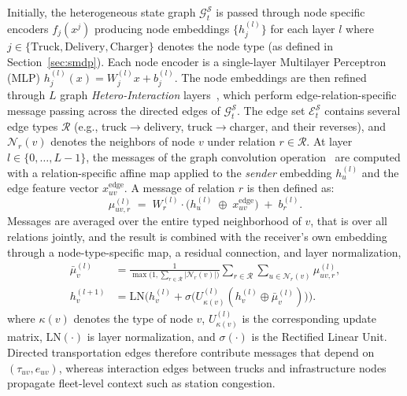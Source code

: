 \documentclass[journal]{IEEEtran}
\begin{document}
Initially, the heterogeneous state graph $\mathcal{G}^{\mathcal{S}}_t$ is passed through node specific encoders $f_j(x^j)$ producing node embeddings $\{h_j^{(l)}\}$ for each layer $l$ where $j\in\{\mathrm{Truck},\mathrm{Delivery},\mathrm{Charger}\}$ denotes the node type (as defined in Section~\ref{sec:smdp}).
Each node encoder is a single-layer Multilayer Perceptron (MLP) $h_j^{(l)}(x)=W^{(l)}_{j}x+b^{(l)}_{j}$. The node embeddings are then refined through $L$ graph \emph{Hetero-Interaction} layers~\cite{arowolo2025generalizationgraphneuralnetworks}, which perform edge-relation-specific message passing across the directed edges of $\mathcal{G}^\mathcal{S}_t$. 
The edge set $\mathcal{E}^\mathcal{S}_t$ contains several edge types $\mathcal{R}$ (e.g., truck$\rightarrow$delivery, truck$\rightarrow$charger, and their reverses), and $\mathcal{N}_r(v)$ denotes the neighbors of node $v$ under relation $r\in\mathcal{R}$. 
At layer $l\in\{0,\dots,L-1\}$, the messages of the graph convolution operation~\cite{kipf} are computed with a relation-specific affine map applied to the \emph{sender} embedding $h^{(l)}_u$ and the edge feature vector $x^\text{edge}_{uv}$. A message of relation $r$ is then defined as:
\begin{equation}
\mu^{(l)}_{uv,r} \;=\; W^{(l)}_{r} \cdot \big(h_u^{(l)} \; \oplus\; x^\text{edge}_{uv}\big) \;+\;b^{(l)}_{r}.
\label{eq:message}
\end{equation}
Messages are averaged over the entire typed neighborhood of $v$, that is over all relations jointly, and the result is combined with the receiver's own embedding through a node-type-specific map, a residual connection, and layer normalization,
\begin{equation}
\begin{split}
\bar{\mu}^{(l)}_{v}
&=
\frac{1}{\max\!\big(1,\textstyle\sum_{r\in\mathcal{R}}|\mathcal{N}_r(v)|\big)}
\sum_{r\in\mathcal{R}}\sum_{u\in\mathcal{N}_r(v)} \mu^{(l)}_{uv,r},\\
h_v^{(l+1)}
&=
\mathrm{LN}\!\Big(
h_v^{(l)} + \sigma\big(U^{(l)}_{\kappa(v)}(h_v^{(l)} \oplus \bar{\mu}^{(l)}_{v})\big)
\Big).
\end{split}
\label{eq:update}
\end{equation}
where $\kappa(v)$ denotes the type of node $v$, $U^{(l)}_{\kappa(v)}$ is the corresponding update matrix, $\mathrm{LN}(\cdot)$ is layer normalization, and $\sigma(\cdot)$ is the Rectified Linear Unit. Directed transportation edges therefore contribute messages that depend on $(\tau_{uv},e_{uv})$, whereas interaction edges between trucks and infrastructure nodes propagate fleet-level context such as station congestion.
\end{document}
